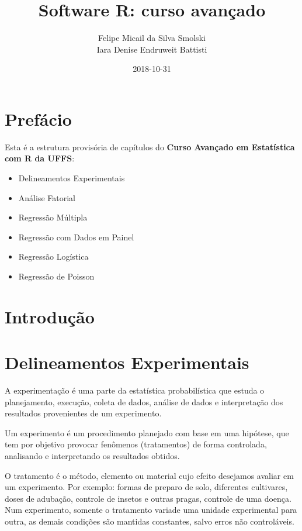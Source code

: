 \documentclass[12pt,brazil,oneside]{book}
\title{Software R: curso avançado}
\author{Felipe Micail da Silva Smolski \\ Iara Denise Endruweit Battisti}
\date{2018-10-31}
\providecommand{\tightlist}{%
  \setlength{\itemsep}{0pt}\setlength{\parskip}{0pt}}
\begin{document}
\maketitle

{
\setcounter{tocdepth}{1}
\tableofcontents
}
\hypertarget{prefacio}{%
\chapter*{Prefácio}\label{prefacio}}

Esta é a estrutura provisória de capítulos do \textbf{Curso Avançado em
Estatística com R da UFFS}:

\begin{itemize}
\tightlist
\item
  Delineamentos Experimentais
\item
  Análise Fatorial
\item
  Regressão Múltipla
\item
  Regressão com Dados em Painel
\item
  Regressão Logística
\item
  Regressão de Poisson
\end{itemize}

\hypertarget{introducao}{%
\chapter*{Introdução}\label{introducao}}

\hypertarget{delineamentos-experimentais}{%
\chapter{Delineamentos
Experimentais}\label{delineamentos-experimentais}}

A experimentação é uma parte da estatística probabilística que estuda o
planejamento, execução, coleta de dados, análise de dados e
interpretação dos resultados provenientes de um experimento.

Um experimento é um procedimento planejado com base em uma hipótese, que
tem por objetivo provocar fenômenos (tratamentos) de forma controlada,
analisando e interpretando os resultados obtidos.

O tratamento é o método, elemento ou material cujo efeito desejamos
avaliar em um experimento. Por exemplo: formas de preparo de solo,
diferentes cultivares, doses de adubação, controle de insetos e outras
pragas, controle de uma doença. Num experimento, somente o tratamento
variade uma unidade experimental para outra, as demais condições são
mantidas constantes, salvo erros não controláveis.
\end{document}
